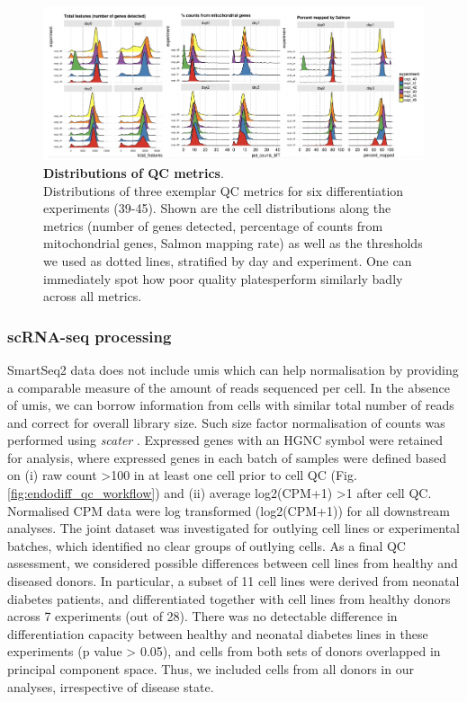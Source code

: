 \begin{figure}[h]
\centering
\includegraphics[width=15cm]{Chapter4/Fig/endodiff_qc_examples.png}
\caption[Distributions of QC metrics]{\textbf{Distributions of QC metrics}.\\
Distributions of three exemplar QC metrics for six differentiation experiments (39-45).
Shown are the cell distributions along the metrics (number of genes detected, percentage of counts from mitochondrial genes, Salmon \cite{patro2017salmon} mapping rate) as well as the thresholds we used as dotted lines, stratified by day and experiment.
One can immediately spot how poor quality plates\footnotemark perform similarly badly across all metrics.}
\label{fig:endodiff_qc_distributions}
\end{figure}



\subsubsection{scRNA-seq processing}

SmartSeq2 data does not include \gls{umis} which can help normalisation by providing a comparable measure of the amount of reads sequenced per cell. 
In the absence of \gls{umis}, we can borrow information from cells with similar total number of reads and correct for overall library size. 
Such size factor normalisation of counts was performed using \textit{scater} \cite{mccarthy2017scater}. 
Expressed genes with an HGNC symbol were retained for analysis, where expressed genes in each batch of samples were defined based on (i) raw count >100 in at least one cell prior to cell QC (Fig. \ref{fig:endodiff_qc_workflow}) and (ii) average log2(CPM+1) >1 after cell QC. 
Normalised CPM data were log transformed (log2(CPM+1)) for all downstream analyses. 
The joint dataset was investigated for outlying cell lines or experimental batches, which identified no clear groups of outlying cells. 
As a final QC assessment, we considered possible differences between cell lines from healthy and diseased donors. 
In particular, a subset of 11 cell lines were derived from neonatal diabetes patients, and differentiated together with cell lines from healthy donors across 7 experiments (out of 28). 
There was no detectable difference in differentiation capacity between healthy and neonatal diabetes lines in these experiments (p value > 0.05), and cells from both sets of donors overlapped in principal component space. 
Thus, we included cells from all donors in our analyses, irrespective of disease state.


